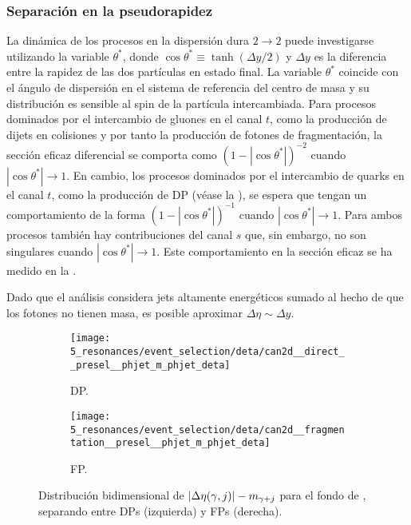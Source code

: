 \subsubsection{Separación en la pseudorapidez}
\label{subsubsec:evt_selection:sr_opt:eta:deta}


La dinámica de los procesos en la dispersión dura \(2 \to 2\) puede investigarse utilizando la variable \(\theta^*\), donde \(\cos\theta^* \equiv \tanh \left(\Delta y / 2\right)\) y \(\Delta y\) es la diferencia entre la rapidez de las dos partículas en estado final. La variable \(\theta^*\) coincide con el ángulo de dispersión en el sistema de referencia del centro de masa y su distribución es sensible al spin de la partícula intercambiada. Para procesos dominados por el intercambio de gluones en el canal \(t\), como la producción de dijets en colisiones \pp y por tanto la producción de fotones de fragmentación, la sección eficaz diferencial se comporta como \(\left(1 - \left|\cos \theta^*\right|\right)^{-2}\) cuando \(\left|\cos \theta^*\right| \to 1\). En cambio, los procesos dominados por el intercambio de quarks en el canal \(t\), como la producción de \ac{DP} (véase la \Fig{\ref{fig:theory:sm:prompt_photon:feynman_lo_direct}}), se espera que tengan un comportamiento de la forma \(\left(1 - \left|\cos \theta^*\right|\right)^{-1}\) cuando \(\left|\cos \theta^*\right| \to 1\). Para ambos procesos también hay contribuciones del canal \(s\) que, sin embargo, no son singulares cuando \(\left|\cos \theta^*\right| \to 1\).
Este comportamiento en la sección eficaz se ha medido en la .

Dado que el análisis considera jets altamente energéticos sumado al hecho de que los fotones no tienen masa, es posible aproximar \(\Delta\eta \sim \Delta y\).

\begin{figure}[ht!]
    \centering
    \begin{subfigure}[h]{0.49\linewidth}
        \centering
        \texttt{[image: 5\_resonances/event\_selection/deta/can2d\_\_direct\_\_presel\_\_phjet\_m\_phjet\_deta]}
        \caption{\acf{DP}.}
        \label{fig:evt_selection:sr_opt:eta:deta:2d:direct}
    \end{subfigure}
    \hfill
    \begin{subfigure}[h]{0.49\linewidth}
        \centering
        \texttt{[image: 5\_resonances/event\_selection/deta/can2d\_\_fragmentation\_\_presel\_\_phjet\_m\_phjet\_deta]}
        \caption{\acf{FP}.}
        \label{fig:evt_selection:sr_opt:eta:deta:2d:frag}
    \end{subfigure}
    \caption{Distribución bidimensional de \(|\Delta\eta(\gamma, j)|-m_{\gamma+j}\) para el fondo de \gammajet, separando entre \acp{DP} (izquierda) y \acp{FP} (derecha).}
    \label{fig:evt_selection:sr_opt:eta:deta:2d}
\end{figure}


